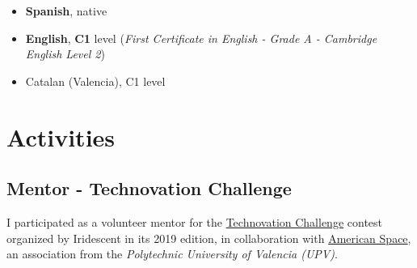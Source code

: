 \documentclass[letterpaper, 12pt, dvipsnames]{article}
\newcommand{\upvFull}{{\upvName} ({\upv})}
\newcommand{\upvName}{Polytechnic University of Valencia}
\newcommand{\upv}{UPV}
\newcommand{\fce}{\emph{First Certificate in English - Grade A - Cambridge English Level 2}}
\begin{document}
\begin{itemize}
    \item \textbf{Spanish}, native
    \item \textbf{English}, \textbf{C1} level (\fce)
    \item Catalan (Valencia), C1 level
\end{itemize}

\section*{Activities}

\subsection*{Mentor - Technovation Challenge}

I participated as a volunteer mentor for the \href{https://technovationchallenge.org/}{Technovation Challenge} contest organized by Iridescent in its 2019 edition, in collaboration with \href{https://americanspacev.upv.es/}{American Space}, an association from the \emph{\upvFull}.


\end{document}

